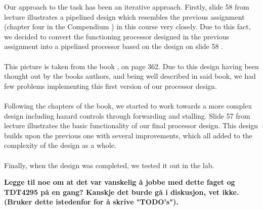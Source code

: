 Our approach to the task has been an iterative approach. Firstly, slide 58 from
lecture \cite{slides-6} illustrates a pipelined design which resembles the
previous assignment (chapter four in the Compendium \cite{compendium}) in this
course very closely. Due to this fact, we decided to convert the functioning
processor designed in the previous assignment into a pipelined processor based
on the design on slide 58 \cite{slides-6}.
\paragraph*{}
This picture is taken from the book \cite{patterson12}, on page 362. Due to this
design having been thought out by the books authors, and being well described in
said book, we had few problems implementing this first version of our processor
design.
\paragraph*{}
Following the chapters of the book, we started to work towards a more complex
design including hazard controls through forwarding and stalling. Slide 57 from
lecture \cite{slides-7} illustrates the basic functionality of our final
processor design. This design builds upon the previous one with several
improvements, which all added to the complexity of the design as a whole.
\paragraph*{}
Finally, when the design was completed, we tested it out in the lab.

\textbf{Legge til noe om at det var vanskelig å jobbe med dette faget og TDT4295
på en gang? Kanskje det burde gå i diskusjon, vet ikke. (Bruker dette istedenfor
for å skrive "TODO's").}
